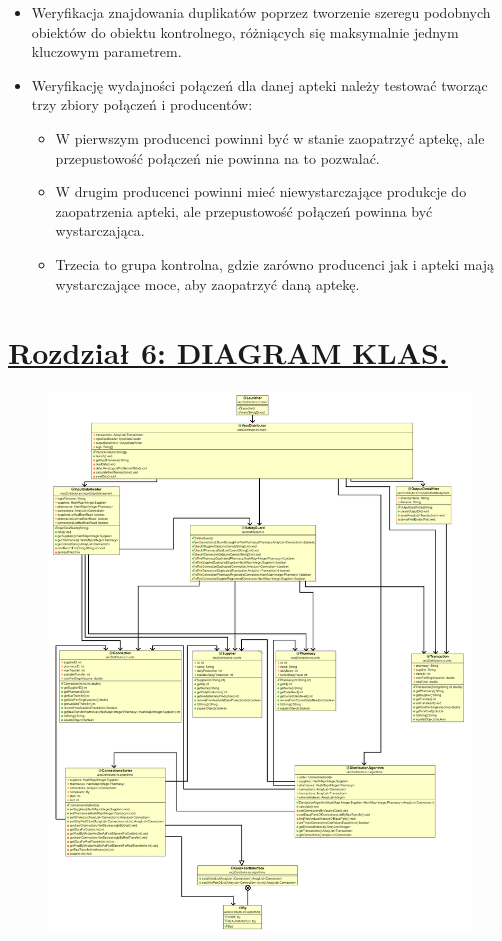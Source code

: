 \documentclass[a4paper]{article}
\begin{document}
\begin{enumerate}
\begin{itemize}
	\item Weryfikacja znajdowania duplikatów poprzez tworzenie szeregu podobnych obiektów do obiektu kontrolnego, różniących się maksymalnie jednym kluczowym parametrem.
	\item Weryfikację wydajności połączeń dla danej apteki należy testować tworząc trzy zbiory połączeń i producentów:
		\begin{itemize}
		\item W pierwszym producenci powinni być w stanie zaopatrzyć aptekę, ale przepustowość połączeń nie powinna na to pozwalać.
		\item W drugim producenci powinni mieć niewystarczające produkcje do zaopatrzenia apteki, ale przepustowość połączeń powinna być wystarczająca.
		\item Trzecia to grupa kontrolna, gdzie zarówno producenci jak i apteki mają wystarczające moce, aby zaopatrzyć daną aptekę.
		\end{itemize}
	\end{itemize}
\end{enumerate}
\newpage

\section*{\underline{Rozdział 6: DIAGRAM KLAS.}}
\begin{figure}[H]
    \includegraphics[width=15cm]{Diagram.png}
    \centering
\end{figure}
\end{document}
